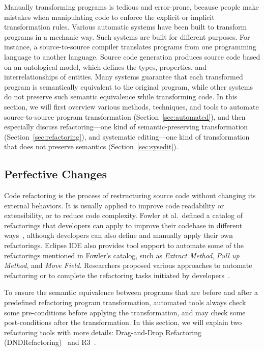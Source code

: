 \documentclass[runningheads,a4paper]{llncs}
\begin{document}
Manually transforming programs is tedious and error-prone, because people make mistakes when manipulating code to enforce the explicit or implicit transformation rules.
Various automatic systems have been built to transform programs in a mechanic way. Such systems are built for different purposes. For instance, a source-to-source compiler translates programs from one programming language to another language. Source code generation produces source code based on an ontological model, which defines the types, properties, and interrelationships of entities. 
Many systems guarantee that each transformed program is semantically equivalent to the original program, while other systems do not preserve such semantic equivalence while transforming code. In this section, we will first overview various methods, techniques, and tools to automate source-to-source program transformation (Section~\ref{sec:automated}), and then especially discuss refactoring---one kind of semantic-preserving transformation (Section~\ref{sec:refactoring}), and systematic editing---one kind of transformation that does not preserve semantics (Section~\ref{sec:sysedit}).

\subsection{Perfective Changes} 

Code refactoring is the process of restructuring source code without changing its external behaviors. It is usually applied to improve code readability or extensibility, or to reduce code complexity. 
Fowler et al.~defined a catalog of refactorings that developers can apply to improve their codebase in different ways~\cite{1999:RID}, although developers can also define and manually apply their own refactorings. Eclipse IDE also provides tool support to automate some of the refactorings mentioned in Fowler's catalog, such as \emph{Extract Method}, \emph{Pull up Method}, and \emph{Move Field}. Researchers proposed various approaches to automate refactoring or to complete the refactoring tasks initiated by developers~\cite{Griswold:1992,Balazinska1999,Dig:2009,Ge:2012,Chen:2013,Lee:2013,Tsantalis2013:icsm,Meng:2015,Kim:2016}.

To ensure the semantic equivalence between programs that are before and after a predefined refactoring program transformation, automated tools always check some pre-conditions before applying the transformation, and may check some post-conditions after the transformation.
In this section, we will explain two refactoring tools with more details: Drag-and-Drop Refactoring (DNDRefactoring)~\cite{Lee:2013} and R3~\cite{Kim:2016}.
\end{document}
